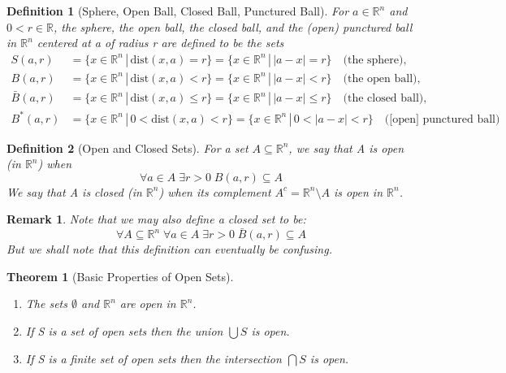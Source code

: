 \documentclass[11pt, oneside]{book}
\theoremstyle{break}
\newtheorem{thm}{Theorem}[section]
\newtheorem*{remark}{Remark}
\newtheorem{defn}{Definition}[section]
\newcommand{\bb}[1]{\mathbb{#1}}			%
\begin{document}
\begin{defn}[Sphere, Open Ball, Closed Ball, Punctured Ball]
	For $a \in \bb{R}^n$ and $0 < r \in \bb{R}$, the sphere, the open ball, the closed ball, and the (open) punctured ball in $\bb{R}^n$ centered at a of radius r are defined to be the sets
	\begin{align*}
		S(a, r) 	  &= \{x \in \bb{R}^n \, | \, \text{dist}(x, a) = r \} = \{x \in \bb{R}^n \, | \, |a - x| = r\} \quad \text{(the sphere)}, \\
		B(a, r) 	  &= \{x \in \bb{R}^n \, | \, \text{dist}(x, a) < r \} = \{x \in \bb{R}^n \, | \, |a - x| < r\} \quad \text{(the open ball)}, \\
		\bar{B}(a, r) &= \{x \in \bb{R}^n \, | \, \text{dist}(x, a) \leq r \} = \{x \in \bb{R}^n \, | \, |a - x| \leq r\} \quad \text{(the closed ball)}, \\
		B^*(a, r)	  &= \{x \in \bb{R}^n \, | \, 0 < \text{dist}(x, a) < r \} = \{x \in \bb{R}^n \, | \, 0 < |a - x| < r\} \quad \text{([open] punctured ball)}
	\end{align*}
\end{defn}

\begin{defn}[Open and Closed Sets]
	For a set $A \subseteq \bb{R}^n$, we say that A is open (in $\bb{R}^n$) when
	\begin{equation*}
		\forall a \in A \; \exists r > 0 \; B(a, r) \subseteq A
	\end{equation*}
	We say that A is closed (in $\bb{R}^n$) when its complement $A^c = \bb{R}^n \setminus A$ is open in $\bb{R}^n$.
\end{defn}

\begin{remark}
	Note that we may also define a closed set to be:
	\begin{equation*}
		\forall A \subseteq \bb{R}^n \; \forall a \in A \; \exists r > 0 \; \bar{B}(a, r) \subseteq A
	\end{equation*}
	But we shall note that this definition can eventually be confusing.
\end{remark}

\begin{thm}[Basic Properties of Open Sets]
	\begin{enumerate}
		\item The sets $\emptyset$ and $\bb{R}^n$ are open in $\bb{R}^n$.
		\item If S is a set of open sets then the union $\bigcup S$ is open.
		\item If S is a finite set of open sets then the intersection $\bigcap S$ is open.
	\end{enumerate}
\end{thm}
\end{document}
